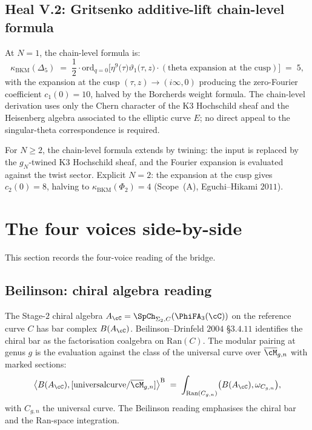 \subsection*{Heal V.2: Gritsenko additive-lift chain-level formula}

At $N = 1$, the chain-level formula is:
\begin{equation}
\label{eq:gritsenko-additive-lift-formula}
 \kappa_{\mathrm{BKM}}(\Delta_5) \;=\; \frac{1}{2}
 \cdot \mathrm{ord}_{q = 0}\bigl[\eta^9\bigl(\tau\bigr) \vartheta_1\bigl(\tau, z\bigr)
 \cdot (\text{theta expansion at the cusp})\bigr] \;=\; 5,
\end{equation}
with the expansion at the cusp $(\tau, z) \to (i\infty, 0)$ producing the
zero-Fourier coefficient $c_1(0) = 10$, halved by the Borcherds weight
formula. The chain-level derivation uses only the Chern character of
the K3 Hochschild sheaf and the Heisenberg algebra associated to the
elliptic curve $E$; no direct appeal to the singular-theta correspondence
is required.

For $N \geq 2$, the chain-level formula extends by twining: the input is
replaced by the $g_N$-twined K3 Hochschild sheaf, and the Fourier expansion
is evaluated against the twist sector. Explicit $N = 2$: the expansion
at the cusp gives $c_2(0) = 8$, halving to $\kappa_{\mathrm{BKM}}(\Phi_2) = 4$
(Scope~(A), Eguchi--Hikami $2011$).


\section{The four voices side-by-side}
\label{sec:four-voices-side-by-side}

This section records the four-voice reading of the bridge.

\subsection*{Beilinson: chiral algebra reading}

The Stage-$2$ chiral algebra $A_\cC = \SpCh_{\Sigma_2, C}(\PhiFA_3(\cC))$
on the reference curve $C$ has bar complex $B(A_\cC)$. Beilinson--Drinfeld
$2004$ \S$3.4.11$ identifies the chiral bar as the factorisation coalgebra
on $\mathrm{Ran}(C)$. The modular pairing at genus $g$ is the evaluation
against the class of the universal curve over $\overline{\cM}_{g, n}$
with marked sections:
\[
 \bigl\langle B(A_\cC),
 [\mathrm{universal curve} / \overline{\cM}_{g, n}]\bigr\rangle^{\mathrm{B}}
 \;=\; \int_{\mathrm{Ran}(C_{g, n})} \bigl(B(A_\cC), \omega_{C_{g, n}}\bigr),
\]
with $C_{g, n}$ the universal curve. The Beilinson reading emphasises
the chiral bar and the Ran-space integration.

